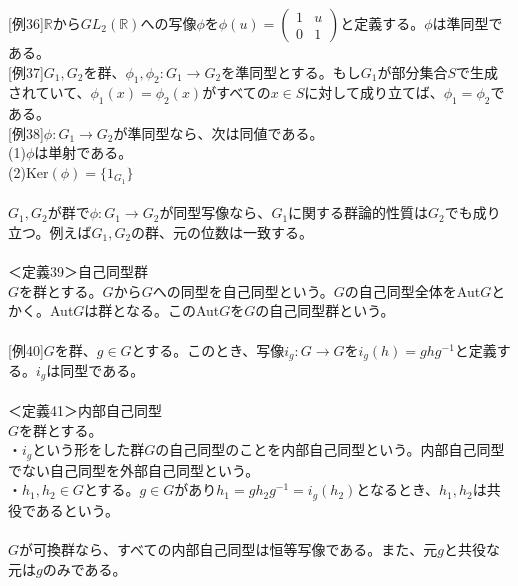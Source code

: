 \documentclass{jsarticle}
\begin{document}
\hspace{5mm}[例36]\(\mathbb{R}\)から\(GL_{2}(\mathbb{R})\)への写像\(\phi\)を\(\phi(u)=\left(\begin{array}{cc}
1&u\\
0&1
\end{array}\right)\)と定義する。\(\phi\)は準同型である。\\
\hspace{5mm}[例37]\(G_{1},G_{2}\)を群、\(\phi_{1},\phi_{2}:G_{1}\rightarrow G_{2}\)を準同型とする。もし\(G_{1}\)が部分集合\(S\)で生成されていて、\(\phi_{1}(x)=\phi_{2}(x)\)がすべての\(x\in S\)に対して成り立てば、\(\phi_{1}=\phi_{2}\)である。\\
\hspace{5mm}[例38]\(\phi:G_{1}\rightarrow G_{2}\)が準同型なら、次は同値である。\\
\hspace{5mm}(1)\(\phi\)は単射である。\\
\hspace{5mm}(2)Ker\((\phi)=\{1_{G_{1}}\}\)\\
\\
\(G_{1},G_{2}\)が群で\(\phi:G_{1}\rightarrow G_{2}\)が同型写像なら、\(G_{1}\)に関する群論的性質は\(G_{2}\)でも成り立つ。例えば\(G_{1},G_{2}\)の群、元の位数は一致する。\\
\\
＜定義39＞自己同型群\\
\(G\)を群とする。\(G\)から\(G\)への同型を自己同型という。\(G\)の自己同型全体をAut\(G\)とかく。Aut\(G\)は群となる。このAut\(G\)を\(G\)の自己同型群という。\\
\\
\hspace{5mm}[例40]\(G\)を群、\(g\in G\)とする。このとき、写像\(i_{g}:G\rightarrow G\)を\(i_{g}(h)=ghg^{-1}\)と定義する。\(i_{g}\)は同型である。\\
\\
＜定義41＞内部自己同型\\
\(G\)を群とする。\\
・\(i_{g}\)という形をした群\(G\)の自己同型のことを内部自己同型という。内部自己同型でない自己同型を外部自己同型という。\\
・\(h_{1},h_{2}\in G\)とする。\(g\in G\)があり\(h_{1}=gh_{2}g^{-1}=i_{g}(h_{2})\)となるとき、\(h_{1},h_{2}\)は共役であるという。\\
\\
\(G\)が可換群なら、すべての内部自己同型は恒等写像である。また、元\(g\)と共役な元は\(g\)のみである。\\
\end{document}

